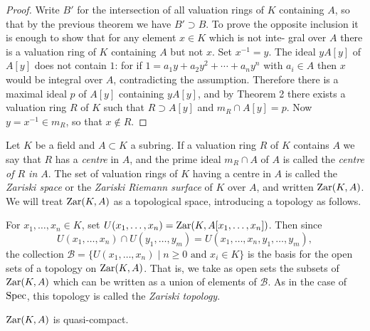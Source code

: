 \begin{proof}
Write $B'$ for the intersection of all valuation rings of $K$ containing
$A$, so that by the previous theorem we have $B' \supset B$. To prove the opposite
inclusion it is enough to show that for any element $x \in K$ which is not inte-
gral over $A$ there is a valuation ring of $K$ containing $A$ but not $x$. Set
$x^{-1} = y$. The ideal $yA[y]$ of $A[y]$ does not contain $1$: for if $1 = a_1y +
a_2y^2 + \cdots + a_ny^n$ with $a_i \in A$ then $x$ would be integral over $A$, contradicting
the assumption. Therefore there is a maximal ideal $p$ of $A[y]$ containing
$yA[y]$, and by Theorem 2 there exists a valuation ring $R$ of $K$ such that
$R \supset A[y]$ and $m_R \cap A[y] = p$. Now $y = x^{-1} \in m_R$, so that $x \notin R$.
\end{proof}

Let $K$ be a field and $A \subset K$ a subring. If a valuation ring $R$ of $K$ contains $A$
we say that $R$ has a \emph{centre} in $A$, and the prime ideal $m_R \cap A$ of $A$ is called the
\emph{centre of $R$ in $A$}. The set of valuation rings of $K$ having a centre in $A$ is called
the \emph{Zariski space} or the \emph{Zariski Riemann surface} of $K$ over $A$, and written
$\operatorname{Zar}(K, A)$. We will treat $\operatorname{Zar}(K, A)$ as a topological space, introducing a
topology as follows.

For $x_1, \ldots, x_n \in K$, set $U(x_1, \ldots, x_n) = \operatorname{Zar}(K, A[x_1, \ldots, x_n])$. Then since
\[
  U(x_1, \ldots, x_n) \cap U(y_1, \ldots, y_m) = U(x_1, \ldots, x_n, y_1, \ldots, y_m),
\]
the collection $\mathcal{B} = \{U(x_1, \ldots, x_n) \mid n \ge 0 \text{ and } x_i \in K\}$ is the basis for
the open sets of a topology on $\operatorname{Zar}(K, A)$. That is, we take as open sets the
subsets of $\operatorname{Zar}(K, A)$ which can be written as a union of elements of $\mathcal{B}$.
As in the case of $\operatorname{Spec}$, this topology is called the \emph{Zariski topology}.

\begin{theorem}\label{thm:10.5}
$\operatorname{Zar}(K, A)$ is quasi-compact.
\end{theorem}

